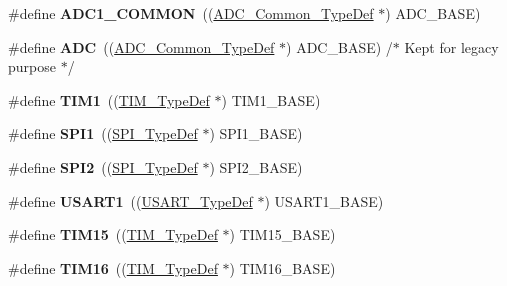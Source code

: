 \begin{DoxyCompactItemize}
\#define {\bfseries A\+D\+C1\+\_\+\+C\+O\+M\+M\+ON}~((\hyperlink{struct_a_d_c___common___type_def}{A\+D\+C\+\_\+\+Common\+\_\+\+Type\+Def} $\ast$) A\+D\+C\+\_\+\+B\+A\+SE)
\item 
\mbox{\label{group___peripheral__declaration_ga54d148b91f3d356713f7e367a2243bea}} 
\#define {\bfseries A\+DC}~((\hyperlink{struct_a_d_c___common___type_def}{A\+D\+C\+\_\+\+Common\+\_\+\+Type\+Def} $\ast$) A\+D\+C\+\_\+\+B\+A\+SE) /$\ast$ Kept for legacy purpose $\ast$/
\item 
\mbox{\label{group___peripheral__declaration_ga2e87451fea8dc9380056d3cfc5ed81fb}} 
\#define {\bfseries T\+I\+M1}~((\hyperlink{struct_t_i_m___type_def}{T\+I\+M\+\_\+\+Type\+Def} $\ast$) T\+I\+M1\+\_\+\+B\+A\+SE)
\item 
\mbox{\label{group___peripheral__declaration_gad483be344a28ac800be8f03654a9612f}} 
\#define {\bfseries S\+P\+I1}~((\hyperlink{struct_s_p_i___type_def}{S\+P\+I\+\_\+\+Type\+Def} $\ast$) S\+P\+I1\+\_\+\+B\+A\+SE)
\item 
\mbox{\label{group___peripheral__declaration_gaf2c3d8ce359dcfbb2261e07ed42af72b}} 
\#define {\bfseries S\+P\+I2}~((\hyperlink{struct_s_p_i___type_def}{S\+P\+I\+\_\+\+Type\+Def} $\ast$) S\+P\+I2\+\_\+\+B\+A\+SE)
\item 
\mbox{\label{group___peripheral__declaration_ga92871691058ff7ccffd7635930cb08da}} 
\#define {\bfseries U\+S\+A\+R\+T1}~((\hyperlink{struct_u_s_a_r_t___type_def}{U\+S\+A\+R\+T\+\_\+\+Type\+Def} $\ast$) U\+S\+A\+R\+T1\+\_\+\+B\+A\+SE)
\item 
\mbox{\label{group___peripheral__declaration_ga87e4b442041d1c03a6af113fbe04a182}} 
\#define {\bfseries T\+I\+M15}~((\hyperlink{struct_t_i_m___type_def}{T\+I\+M\+\_\+\+Type\+Def} $\ast$) T\+I\+M15\+\_\+\+B\+A\+SE)
\item 
\mbox{\label{group___peripheral__declaration_ga73ec606e7dacf17e18c661e8ff8c7c8d}} 
\#define {\bfseries T\+I\+M16}~((\hyperlink{struct_t_i_m___type_def}{T\+I\+M\+\_\+\+Type\+Def} $\ast$) T\+I\+M16\+\_\+\+B\+A\+SE)

\end{DoxyCompactItemize}

